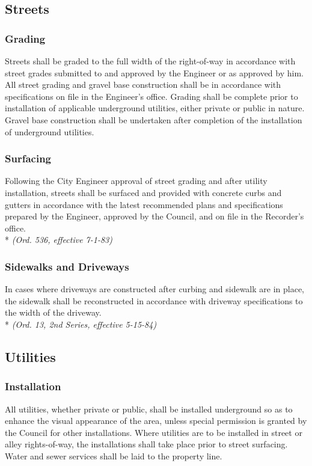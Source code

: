 \subsection{Streets}
\subsubsection{Grading}
Streets shall be graded to the full width of the right-of-way in accordance with street grades submitted to and approved by the Engineer or as approved by him. All street grading and gravel base construction shall be in accordance with specifications on file in the Engineer’s office. Grading shall be complete prior to installation of applicable underground utilities, either private or public in nature. Gravel base construction shall be undertaken after completion of the installation of underground utilities.
\subsubsection{Surfacing}
Following the City Engineer approval of street grading and after utility installation, streets shall be surfaced and provided with concrete curbs and gutters in accordance with the latest recommended plans and specifications prepared by the Engineer, approved by the Council, and on file in the Recorder’s office.\\*
\emph{(Ord. 536, effective 7-1-83)}
\subsubsection{Sidewalks and Driveways}
In cases where driveways are constructed after curbing and sidewalk are in place, the sidewalk shall be reconstructed in accordance with driveway specifications to the width of the driveway.\\*
\emph{(Ord. 13, 2nd Series, effective 5-15-84)}
\subsection{Utilities}
\subsubsection{Installation}
All utilities, whether private or public, shall be installed underground so as to enhance the visual appearance of the area, unless special permission is granted by the Council for other installations. Where utilities are to be installed in street or alley rights-of-way, the installations shall take place prior to street surfacing. Water and sewer services shall be laid to the property line.
